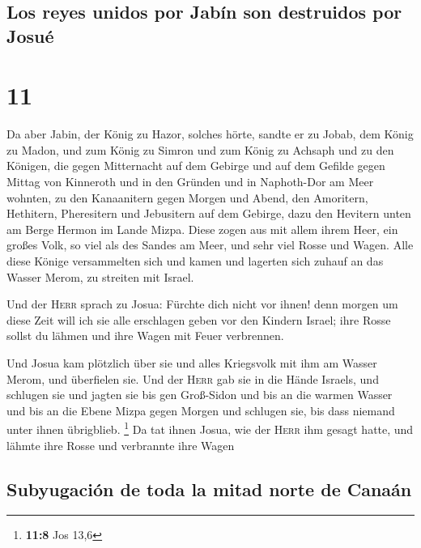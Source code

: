 \hypertarget{los-reyes-unidos-por-jabuxedn-son-destruidos-por-josuuxe9}{%
\subsection{Los reyes unidos por Jabín son destruidos por
Josué}\label{los-reyes-unidos-por-jabuxedn-son-destruidos-por-josuuxe9}}

\hypertarget{section-10}{%
\section{11}\label{section-10}}

 Da aber Jabin, der König zu Hazor, solches hörte, sandte
er zu Jobab, dem König zu Madon, und zum König zu Simron und zum König
zu Achsaph  und zu den Königen, die gegen Mitternacht auf
dem Gebirge und auf dem Gefilde gegen Mittag von Kinneroth und in den
Gründen und in Naphoth-Dor am Meer wohnten,  zu den
Kanaanitern gegen Morgen und Abend, den Amoritern, Hethitern,
Pheresitern und Jebusitern auf dem Gebirge, dazu den Hevitern unten am
Berge Hermon im Lande Mizpa.  Diese zogen aus mit allem
ihrem Heer, ein großes Volk, so viel als des Sandes am Meer, und sehr
viel Rosse und Wagen.  Alle diese Könige versammelten sich
und kamen und lagerten sich zuhauf an das Wasser Merom, zu streiten mit
Israel.

 Und der \textsc{Herr} sprach zu Josua: Fürchte dich nicht
vor ihnen! denn morgen um diese Zeit will ich sie alle erschlagen geben
vor den Kindern Israel; ihre Rosse sollst du lähmen und ihre Wagen mit
Feuer verbrennen.

 Und Josua kam plötzlich über sie und alles Kriegsvolk mit
ihm am Wasser Merom, und überfielen sie.  Und der
\textsc{Herr} gab sie in die Hände Israels, und schlugen sie und jagten
sie bis gen Groß-Sidon und bis an die warmen Wasser und bis an die Ebene
Mizpa gegen Morgen und schlugen sie, bis dass niemand unter ihnen
übrigblieb. \footnote{\textbf{11:8} Jos 13,6}  Da tat
ihnen Josua, wie der \textsc{Herr} ihm gesagt hatte, und lähmte ihre
Rosse und verbrannte ihre Wagen

\hypertarget{subyugaciuxf3n-de-toda-la-mitad-norte-de-canauxe1n}{%
\subsection{Subyugación de toda la mitad norte de
Canaán}\label{subyugaciuxf3n-de-toda-la-mitad-norte-de-canauxe1n}}

